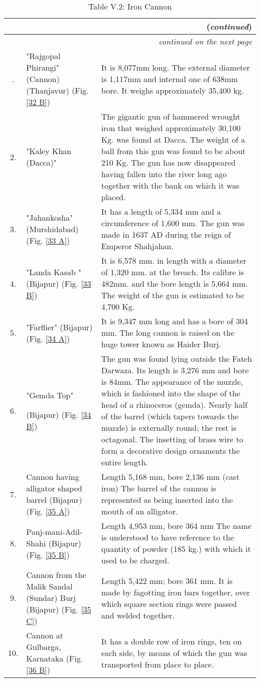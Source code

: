  {\setlength\tabcolsep{2pt}
\begin{longtable}{|c|p{3.5cm}|p{5cm}|}
\caption{Table V.2: Iron Cannon}\label{table V.2}\\
\hline
\endfirsthead
\multicolumn{3}{r}{(\textit{continued})}\\[5pt]
\hline
\endhead
\hline
\multicolumn{3}{r}{\small\itshape continued on the next page}\\
\endfoot
\endlastfoot
1. & "Rajgopal Phirangi" (Cannon) (Thanjavur) (Fig. \ref{32 B}) & It is 8,077mm long. The external diameter is 1,117mm and internal one of 638mm bore. It weighs approximately 35,400 kg.\\
2. & "Kaley Khan (Dacca)" & The gigantic gun of hammered wrought iron that weighed approximately 30,100 Kg. was found at Dacca. The weight of a ball from this gun was found to be about 210 Kg. The gun has now disappeared having fallen into the river long ago together with the bank on which it was placed.\\
3. & "Jahankosha" (Murshidabad) (Fig. \ref{33 A}) & It has a length of 5,334 mm and a circumference of 1,600 mm. The gun was made in 1637 AD during the reign of Emperor Shahjahan.\\
4. & "Landa Kasab " (Bijapur) (Fig. \ref{33 B}) & It is 6,578 mm. in length with a diameter of 1,320 mm. at the breach. Its calibre is 482mm. and the bore length is 5,664 mm. The weight of the gun is estimated to be 4,700 Kg.\\
5. & "Farflier" (Bijapur) (Fig. \ref{34 A}) & It is 9,347 mm long and has a bore of 304 mm. The long cannon is raised on the huge tower known as   Haider Burj. \\
6. & "Gemda Top" \par (Bijapur) (Fig. \ref{34 B}) & The gun was found lying outside the Fateh Darwaza. Its length is 3,276 mm and bore is 84mm.  The appear­ance of the muzzle, which is fashioned into the shape of the head of a rhino­ceros (gemda). Nearly half of the barrel (which tapers towards the muzzle) is externally round; the rest is octagonal. The insetting of brass wire to form a decorative design ornaments the entire length.\\
7. & Cannon having alligator shaped barrel (Bijapur) (Fig. \ref{35 A}) & Length 5,168 mm, bore 2,136 mm (cast iron) The barrel of the cannon is represented as being inserted into the mouth of an alligator. \\
8. & Panj-mani-Adil-Shahi  (Bijapur) (Fig. \ref{35 B}) & Length 4,953 mm, bore 364 mm The name is understood to have reference to the quantity of powder (185 kg.) with which it used to be charged.\\
9. & Cannon  from the Malik Sandal (Sundar) Burj (Bijapur) (Fig. \ref{35 C}) & Length 5,422 mm; bore 361 mm. It is made by fagotting iron bars together, over which square section rings were passed and welded together.\\
10. & Cannon at Gulbarga, Karnataka (Fig. \ref{36 B}) & It has a double row of iron rings, ten on each side, by means of which the gun was transported from place to place.\\
\hline
\end{longtable}
}


